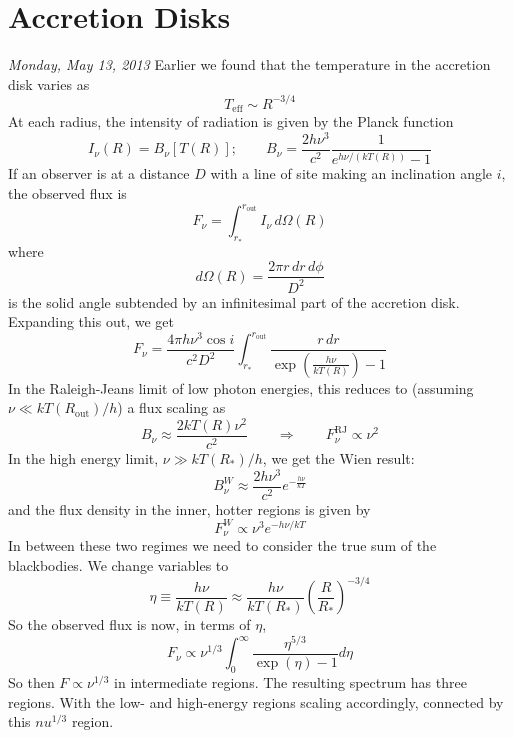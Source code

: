 \documentclass[10pt]{article}
\numberwithin{equation}{section}
\begin{document}
\section{Accretion Disks} %
\label{sec:accretion_disks}
\textit{Monday, May 13, 2013}
Earlier we found that the temperature in the accretion disk varies as
\begin{equation}
	\label{eq:acc2:1}T_{\mathrm{eff}} \sim R^{-3/4}
\end{equation}
At each radius, the intensity of radiation is given by the Planck function
\begin{equation}
	\label{eq:acc2:2} I_\nu(R) = B_\nu[T(R)]; \qquad B_\nu = \frac{2h\nu^3}{c^2}\frac{1}{e^{h\nu/(kT(R))}-1}
\end{equation}
If an observer is at a distance $D$ with a line of site making an inclination angle $i$, the observed flux is
\begin{equation}
	\label{eq:acc2:3} F_\nu = \int_{r_*}^{r_{\mathrm{out}}} I_\nu\,d\Omega(R)
\end{equation}
where
\begin{equation}
	\label{eq:acc2:4} d\Omega(R) = \frac{2\pi r\,dr\,d\phi}{D^2}
\end{equation}
is the solid angle subtended by an infinitesimal part of the accretion disk. Expanding this out, we get
\begin{equation}
	\label{eq:acc2:4} F_\nu = \frac{4\pi h\nu^3\cos i}{c^2D^2}\int_{r_*}^{r_{\mathrm{out}}} \frac{r\,dr}{\exp\left(\frac{h\nu}{kT(R)}\right)-1}
\end{equation}
In the Raleigh-Jeans limit of low photon energies, this reduces to (assuming $\nu \ll kT(R_{\mathrm{out}})/h$) a flux scaling as
\begin{equation}
	\label{eq:acc2:5} B_\nu \approx \frac{2kT(R)\nu^2}{c^2} \qquad \Rightarrow \qquad F_\nu^{\mathrm{RJ}}\propto \nu^2
\end{equation}
In the high energy limit, $\nu \gg kT(R_*)/h$, we get the Wien result:
\begin{equation}
	\label{eq:acc2:6} B_\nu^W \approx \frac{2h\nu^3}{c^2} e^{-\frac{h\nu}{kT}}
\end{equation}
and the flux density in the inner, hotter regions is given by
\begin{equation}
	\label{eq:acc2:7} F_\nu^W \propto \nu^3 e^{-h\nu/kT}
\end{equation}
In between these two regimes we need to consider the true sum of the blackbodies. We change variables to 
\begin{equation}
	\label{eq:acc2:8} \eta\equiv \frac{h\nu}{kT(R)} \approx \frac{h\nu}{kT(R_*)}\left(\frac{R}{R_*}\right)^{-3/4}
\end{equation}
So the observed flux is now, in terms of $\eta$,
\begin{equation}
	\label{eq:acc2:9} F_\nu \propto \nu^{1/3} \int_0^\infty \frac{\eta^{5/3}}{\exp(\eta) - 1}d\eta
\end{equation}
So then $F\propto \nu^{1/3}$ in intermediate regions. The resulting spectrum has three regions. With the low- and high-energy regions scaling accordingly, connected by this $nu^{1/3}$ region.
\end{document}
